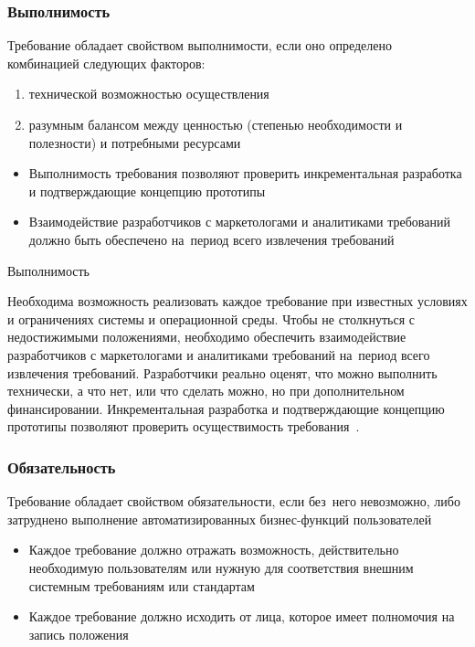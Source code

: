 \documentclass{../industrial-development}
\begin{document}
\begin{frame} \frametitle{Выполнимость}

Требование обладает свойством \alert{выполнимости}, если оно определено комбинацией следующих факторов:
 \begin{enumerate}
 \item технической возможностью
осуществления
\item разумным балансом между ценностью (степенью необходимости и полезности) и потребными ресурсами
 \end{enumerate}
 \begin{itemize}

\item Выполнимость требования позволяют проверить инкрементальная разработка и подтверждающие концепцию прототипы 
\item Взаимодействие разработчиков с маркетологами и аналитиками требований должно быть обеспечено на~период всего извлечения требований
 \end{itemize}
\end{frame}

\lecturenotes

\alert{Выполнимость}

Необходима возможность реализовать каждое требование при известных условиях и ограничениях системы и операционной среды.
Чтобы не столкнуться с недостижимыми положениями, необходимо обеспечить взаимодействие разработчиков с маркетологами и аналитиками требований на~период всего извлечения требований. Разработчики реально оценят, что можно выполнить технически, а что нет, или что сделать можно, но при дополнительном финансировании. Инкрементальная разработка и подтверждающие концепцию прототипы позволяют проверить осуществимость требования~\cite[с.~24]{Wiegers}.



\begin{frame} \frametitle{Обязательность}

Требование обладает свойством \alert{обязательности}, если без~него невозможно, либо затруднено выполнение автоматизированных бизнес-функций пользователей
 \begin{itemize}
 \item Каждое требование должно отражать возможность, действительно необходимую пользователям или нужную для соответствия внешним системным требованиям или стандартам
\item  Каждое требование должно исходить от лица, которое имеет полномочия на запись положения
 \end{itemize}
\end{frame}
\end{document}
